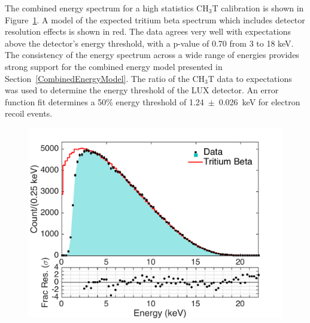 The combined energy spectrum for a high statistics CH$_3$T calibration is shown in Figure~\ref{TritiumSpectrum}.  A model of the expected tritium beta spectrum which includes detector resolution effects is shown in red.  The data agrees very well with expectations above the detector's energy threshold, with a p-value of 0.70 from 3 to 18 keV.  The consistency of the energy spectrum across a wide range of energies provides strong support for the combined energy model presented in Section~\ref{CombinedEnergyModel}.  The ratio of the CH$_3$T data to expectations was used to determine the energy threshold of the LUX detector.  An error function fit determines a 50\% energy threshold of 1.24~$\pm$~0.026~keV for electron recoil events.


\begin{figure} [!h]
\includegraphics[scale=.425]{TritiumSpectrum.pdf} 
\label{TritiumSpectrum}
\end{figure}

